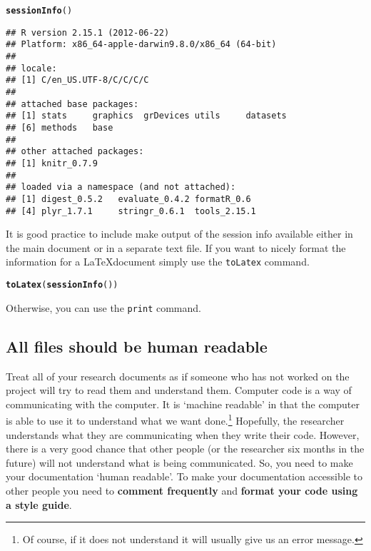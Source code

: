 \documentclass[ChapterTOCs,krantz1]{krantz}\usepackage{graphicx, color}
\makeatletter
\newcommand{\hlfunctioncall}[1]{\textcolor[rgb]{0.501960784313725,0,0.329411764705882}{\textbf{#1}}}%
\newenvironment{kframe}{%
 \def\at@end@of@kframe{}%
 \ifinner\ifhmode%
  \def\at@end@of@kframe{\end{minipage}}%
  \begin{minipage}{\columnwidth}%
 \fi\fi%
 \def\FrameCommand##1{\hskip\@totalleftmargin \hskip-\fboxsep
 \colorbox{shadecolor}{##1}\hskip-\fboxsep
     \hskip-\linewidth \hskip-\@totalleftmargin \hskip\columnwidth}%
 \MakeFramed {\advance\hsize-\width
   \@totalleftmargin\z@ \linewidth\hsize
   \@setminipage}}%
 {\par\unskip\endMakeFramed%
 \at@end@of@kframe}
\newenvironment{knitrout}{}{} %
\makeatother
\begin{document}
\begin{knitrout}
\color{fgcolor}\begin{kframe}
\begin{alltt}
\hlfunctioncall{sessionInfo}()
\end{alltt}
\begin{verbatim}
## R version 2.15.1 (2012-06-22)
## Platform: x86_64-apple-darwin9.8.0/x86_64 (64-bit)
## 
## locale:
## [1] C/en_US.UTF-8/C/C/C/C
## 
## attached base packages:
## [1] stats     graphics  grDevices utils     datasets 
## [6] methods   base     
## 
## other attached packages:
## [1] knitr_0.7.9
## 
## loaded via a namespace (and not attached):
## [1] digest_0.5.2   evaluate_0.4.2 formatR_0.6   
## [4] plyr_1.7.1     stringr_0.6.1  tools_2.15.1
\end{verbatim}
\end{kframe}
\end{knitrout}


\noindent It is good practice to include make output of the session info available either in the main document or in a separate text file. If you want to nicely format the information for a \LaTeX document simply use the {\tt{toLatex}} command.

\begin{knitrout}
\color{fgcolor}\begin{kframe}
\begin{alltt}
\hlfunctioncall{toLatex}(\hlfunctioncall{sessionInfo}())
\end{alltt}
\end{kframe}
\end{knitrout}


\noindent Otherwise, you can use the {\tt{print}} command. 

\subsection{All files should be human readable}

Treat all of your research documents as if someone who has not worked on the project will try to read them and understand them. Computer code is a way of communicating with the computer. It is `machine readable' in that the computer is able to use it to understand what we want done.\footnote{Of course, if it does not understand it will usually give us an error message.} Hopefully, the researcher understands what they are communicating when they write their code. However, there is a very good chance that other people (or the researcher six months in the future) will not understand what is being communicated. So, you need to make your documentation `human readable'. To make your documentation accessible to other people you need to {\bf{comment frequently}} and {\bf{format your code using a style guide}}. 
\end{document}
